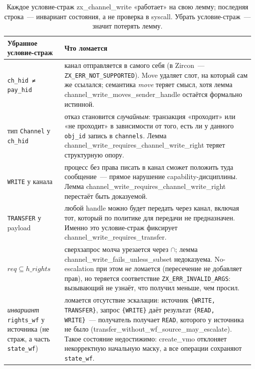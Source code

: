 \documentclass[11pt,a4paper]{article}
\newcommand{\isabel}[1]{{\isabelleit #1}}
\newcommand{\lemmaname}[1]{\isabel{#1}}
\begin{document}
\begin{table}[ht]
	\centering
	\small
	\begin{tabular}{@{}p{}p{}@{}}
		\toprule
		\textbf{Убранное условие-страж}         & \textbf{Что ломается} \\
		\midrule
		\texttt{ch\_hid ≠ pay\_hid}             &
		канал отправляется в самого себя (в Zircon~---
		\texttt{ZX\_ERR\_NOT\_SUPPORTED}). Move удаляет слот,
		на который сам же ссылался; семантика \emph{move} теряет смысл,
		хотя лемма \lemmaname{channel\_write\_moves\_sender\_handle} остаётся
		формально истинной.                                             \\
		\addlinespace
		тип \texttt{Channel} у \texttt{ch\_hid} &
		отказ становится \emph{случайным}: транзакция «проходит» или
		«не проходит» в зависимости от того, есть ли у данного
		\texttt{obj\_id} запись в \texttt{channels}. Лемма
		\lemmaname{channel\_write\_requires\_channel\_write\_right} теряет
		структурную опору.                                              \\
		\addlinespace
		\texttt{WRITE} у канала                 &
		процесс без права писать в канал сможет положить туда сообщение~---
		прямое нарушение \textenglish{capability}-дисциплины. Лемма
		\lemmaname{channel\_write\_requires\_channel\_write\_right} перестаёт
		быть доказуемой.                                                \\
		\addlinespace
		\texttt{TRANSFER} у payload             &
		любой handle можно будет передать через канал, включая тот, который
		по политике для передачи не предназначен. Именно это условие-страж
		фиксирует \lemmaname{channel\_write\_requires\_transfer}.       \\
		\addlinespace
		$\mathit{req}\subseteq h\_rights$       &
		сверхзапрос молча урезается через $\cap$; лемма
		\lemmaname{channel\_write\_fails\_unless\_subset} недоказуема.
		No-escalation при этом \emph{не} ломается (пересечение не
		добавляет прав), но теряется соответствие
		\texttt{ZX\_ERR\_INVALID\_ARGS}: вызывающий не узнаёт, что
		получил меньше, чем просил.                                     \\
		\addlinespace
		\emph{инвариант} \texttt{rights\_wf} у источника
		(не страж, а часть \texttt{state\_wf})  &
		ломается отсутствие эскалации: источник
		\texttt{\{WRITE, TRANSFER\}}, запрос \texttt{\{WRITE\}} даёт
		результат \texttt{\{READ, WRITE\}}~--- получатель получает
		\texttt{READ}, которого у источника не было
		(\lemmaname{transfer\_without\_wf\_source\_may\_escalate}). Такое
		состояние недостижимо: \lemmaname{create\_vmo} отклоняет
		некорректную начальную маску, а все операции сохраняют
		\texttt{state\_wf}.                                             \\
		\bottomrule
	\end{tabular}
	\caption{Каждое условие-страж \lemmaname{zx\_channel\_write} «работает» на свою
		лемму; последняя строка~--- инвариант состояния, а не проверка в
		syscall. Убрать условие-страж~--- значит потерять лемму.}
	\label{tab:write-guards}
\end{table}
\end{document}
